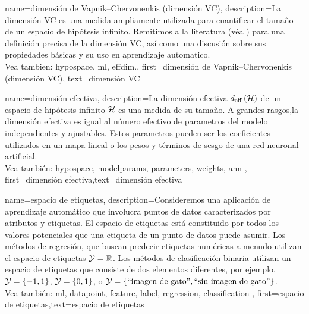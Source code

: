 {name={dimensión de Vapnik–Chervonenkis (dimensión VC)},
description={La dimensión VC 
	es una medida ampliamente utilizada para cuantificar el tamaño de un espacio de hipótesis infinito. 
	Remitimos a la literatura (véa \cite{ShalevMLBook}) para una definición precisa 
	de la dimensión VC, así como una discusión sobre sus propiedades básicas y su uso en aprendizaje automatico.
			\\ 
	Vea tambien: \gls{hypospace}, \gls{ml}, \gls{effdim}.},
first={dimensión de Vapnik–Chervonenkis (dimensión VC)},
text={dimensión VC}  
}


{name={dimensión efectiva},
	description={La dimensión efectiva $d_{\rm eff} \left( \mathcal{H} \right)$ de un 
		espacio de hipótesis infinito $\mathcal{H}$ es una medida de su tamaño. A grandes rasgos,la 
		dimensión efectiva es igual al número efectivo de parametros del modelo independientes y ajustables. 
		Estos parametros pueden ser los coeficientes utilizados en un mapa lineal o los 
		pesos y términos de sesgo de una red neuronal artificial.
		\\
		Vea también: \gls{hypospace}, \gls{modelparams}, \gls{parameters}, \gls{weights}, \gls{ann} },
	first={dimensión efectiva},text={dimensión efectiva}  
}

{name={espacio de etiquetas},
	description={Consideremos una aplicación de aprendizaje automático que involucra puntos de datos caracterizados por atributos
		y etiquetas. El espacio de etiquetas está constituido por todos los valores potenciales que una etiqueta
		de un punto de datos puede asumir. Los métodos de regresión, que buscan predecir etiquetas numéricas 
		a menudo utilizan el espacio de etiquetas $\mathcal{Y} = \mathbb{R}$. Los métodos de clasificación binaria utilizan un espacio de etiquetas  
		que consiste de dos elementos diferentes, por ejemplo, $\mathcal{Y} =\{-1,1\}$, $\mathcal{Y}=\{0,1\}$, 
		o $\mathcal{Y} = \{ \mbox{``imagen de gato''}, \mbox{``sin imagen de gato''} \}$.
		\\
		Vea también: \gls{ml}, \gls{datapoint},  \gls{feature}, \gls{label}, \Gls{regression}, \gls{classification} }, 
		first={espacio de etiquetas},text={espacio de etiquetas}  
}

